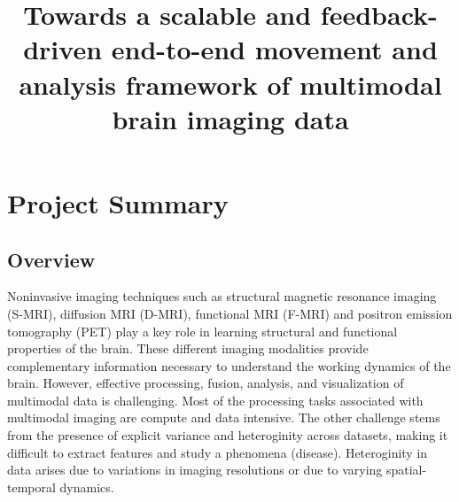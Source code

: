\documentclass[11pt]{article}
\title{Towards a scalable and feedback-driven end-to-end movement and analysis framework of multimodal brain imaging data}
\date{}
\begin{document}
\maketitle
\clearpage
\section{Project Summary}
\subsection{Overview}
Noninvasive imaging techniques such as structural magnetic resonance imaging (S-MRI), diffusion MRI (D-MRI), functional MRI (F-MRI) and
positron emission tomography (PET) play a key role in learning structural and functional properties of the brain.
These different imaging modalities provide complementary information necessary to understand  the working dynamics of the brain. 
However, effective processing, fusion, analysis, and visualization of multimodal data is challenging. 
Most of the processing tasks associated with multimodal imaging are compute and data intensive.
The other challenge stems from the presence of explicit variance and heteroginity across datasets, making it difficult to extract features and study a phenomena (disease). 
Heteroginity in data arises due to variations in imaging resolutions or due to varying spatial-temporal dynamics.

\end{document}
